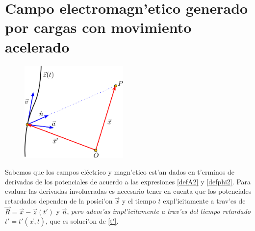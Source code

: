 \section{Campo electromagn'etico generado por cargas con movimiento acelerado}
\begin{figure}[ht]
\centerline{\includegraphics[height=5cm]{fig/fig-vectores.pdf}}
\label{R7}
\end{figure}
Sabemos que los campos eléctrico y magn'etico est'an dados en t'erminos de derivadas de los potenciales de acuerdo a las expresiones \eqref{defA2} y \eqref{defphi2}. Para evaluar las derivadas involucradas es necesario tener en cuenta que los potenciales retardados dependen de la posici'on $\vec{x}$ y el tiempo $t$ expl'icitamente a trav'es de $\vec{R}=\vec{x}-\vec{z}(t')$ y $\vec{n}$, \textit{pero adem'as impl'icitamente a trav'es del tiempo retardado} $t'=t'(\vec{x},t)$, que es soluci'on de \eqref{t'}.

